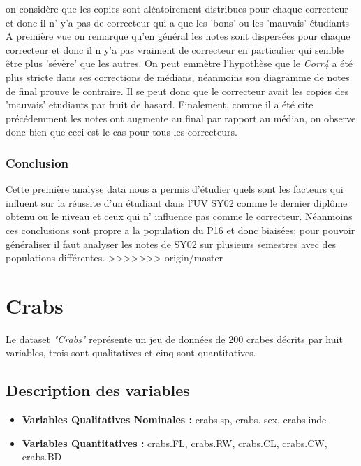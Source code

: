 \documentclass[]{report}
\begin{document}
on considère que les copies sont aléatoirement distribues pour chaque correcteur et donc il n' y'a pas de correcteur qui a que les 'bons' ou les 'mauvais' étudiants A première vue on remarque qu'en général les notes sont dispersées pour chaque correcteur et donc il n y'a pas vraiment de correcteur en particulier qui semble être plus 'sévère' que les autres. On peut emmètre l'hypothèse  que le \textit{Corr4} a été plus stricte dans ses corrections de médians, néanmoins son diagramme de notes de final prouve le contraire. Il se peut donc que le correcteur avait les copies des 'mauvais' etudiants par fruit de hasard. Finalement, comme il a été cite précédemment les notes ont augmente au final par rapport au médian, on observe donc bien que ceci est le cas pour tous les correcteurs.

\subsubsection{Conclusion}
Cette première analyse data nous a permis d'étudier  quels sont les facteurs qui influent sur la réussite d'un étudiant dans l'UV SY02 comme le dernier diplôme obtenu ou le niveau et ceux qui n' influence pas comme le correcteur. Néanmoins ces conclusions sont \underline{propre a la population du P16} et donc  \underline{biaisées}; pour pouvoir généraliser il faut analyser les notes de SY02 sur plusieurs semestres avec des populations différentes.
>>>>>>> origin/master

\section{Crabs}
Le dataset \textit{"Crabs"} représente un jeu de données de 200 crabes décrits par huit variables, trois sont qualitatives et cinq sont quantitatives.

\subsection{Description des variables}


\begin{itemize}
	\item \textbf{Variables Qualitatives Nominales :}  crabs.sp, crabs. sex, crabs.inde
	\item \textbf{Variables Quantitatives : } crabs.FL, crabs.RW, crabs.CL, crabs.CW, crabs.BD
\end{itemize}
\end{document}
